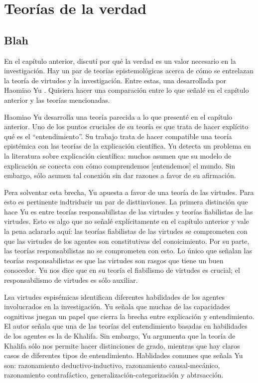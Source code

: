 
\chapter{Teorías de la verdad}

\section{Blah}

En el capítulo anterior, discutí por qué la verdad es un valor necesario en la investigación. Hay un par de teorías epistemológicas acerca de cómo se entrelazan la teoría de virtudes y la investigación. Entre estas, una desarrollada por Haomiao Yu \citeyear{yu2021}. Quisiera hacer una comparación entre lo que señalé en el capítulo anterior y las teorías mencionadas.

Haomiao Yu desarrolla una teoría parecida a lo que presenté en el capítulo anterior. Uno de los puntos cruciales de su teoría es que trata de hacer explícito qué es el ``entendimiento''. Su trabajo trata de hacer compatible una teoría epistémica con las teorías de la explicación científica. Yu detecta un problema en la literatura sobre explicación científica: muchos asumen que su modelo de explicación se conecta con cómo comprendemos [entendemos] el mundo. Sin embargo, sólo asumen tal conexión sin dar razones a favor de su afirmación.

Pera solventar esta brecha, Yu apuesta a favor de una teoría de las virtudes. Para esto es pertinente indtriducir un par de disttinviones. La primera distinción que hace Yu es entre teorías responsabilistas de las virtudes y teorías fiabilistas de las virtudes. Esto es algo que no señalé explícitamente en el capítulo anterior y vale la pena aclararlo aquí: las teorías fiabilistas de las virtudes se comprometen con que las virtudes de los agentes son constitutivas del conoicimiento. Por su parte, las teorías responsabilistas no se comprometen con esto. Lo único que señalan las teorías responsabilistas es que las virtudes son rasgos que tiene un buen conocedor. Yu nos dice que en su teoría el fiabilismo de virtudes es crucial; el responsabilismo de virtudes es sólo auxiliar.

Lsa virtudes espisémicas identifican diferentes habilidades de los agentes involucrados en la investigación. Yu señala que muchas de las capacidades cognitivas juegan un papel que cierra la brecha entre explicación y entendimiento. El autor señala que una de las teorías del entendimiento basadas en habilidades de los agentes es la de Khalifa. Sin embargo, Yu argumenta que la teoría de Khalifa sólo nos permite hacer distinciones de grado, mientras que hay claros casos de diferentes tipos de entendimiento. Hablidades comunes que señala Yu son: razonamiento deductivo-inductivo, razonamiento causal-mecánico, razonamiento contrafáctico, generalización-categorización y abtrsacción. 

